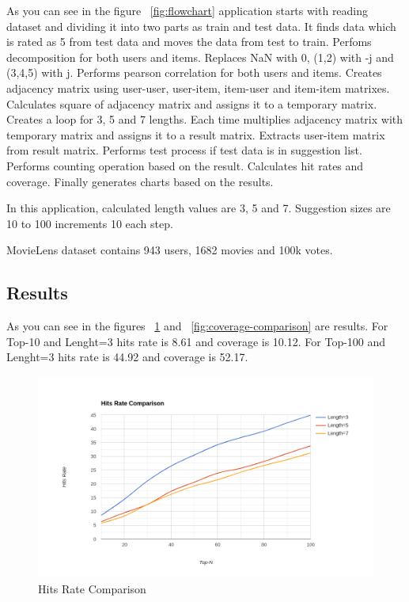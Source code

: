 As you can see in the figure ~\ref{fig:flowchart} application starts with reading dataset and dividing it into two parts as train and test data. It finds data which is rated as 5 from test data and moves the data from test to train. Perfoms decomposition for both users and items. Replaces NaN with 0, (1,2) with -j and (3,4,5) with j. Performs pearson correlation for both users and items. Creates adjacency matrix using user-user, user-item, item-user and item-item matrixes. Calculates square of adjacency matrix and assigns it to a temporary matrix. Creates a loop for 3, 5 and 7 lengths. Each time multiplies adjacency matrix with temporary matrix and assigns it to a result matrix. Extracts user-item matrix from result matrix. Performs test process if test data is in suggestion list. Performs counting operation based on the result. Calculates hit rates and coverage. Finally generates charts based on the results.

In this application, calculated length values are 3, 5 and 7. Suggestion sizes are 10 to 100 increments 10 each step.

MovieLens dataset contains 943 users, 1682 movies and 100k votes.

\subsection{Results}
As you can see in the figures ~\ref{fig:hits-rate-comparison} and ~\ref{fig:coverage-comparison} are results. For Top-10 and Lenght=3 hits rate is 8.61 and coverage is 10.12. For Top-100 and Lenght=3 hits rate is 44.92 and coverage is 52.17.

\begin{figure}[h!]
   \centering
   \includegraphics[width=1\linewidth]{images/hits-rate-comparison.png}
   \caption{Hits Rate Comparison}
   \label{fig:hits-rate-comparison}
\end{figure}

